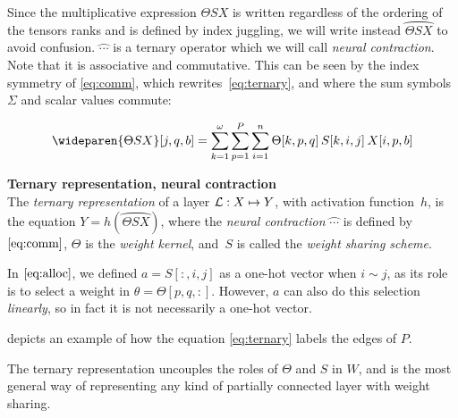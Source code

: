 Since the multiplicative expression $\Theta S X$ is written regardless of the ordering of the tensors ranks and is defined by index juggling, we will write instead $\wideparen{\Theta S X}$ to avoid confusion. $\wideparen{\cdots}$ is a ternary operator which we will call \emph{neural contraction}. Note that it is associative and commutative. This can be seen by the index symmetry of \eqref{eq:comm}, which rewrites~\eqref{eq:ternary}, and where the sum symbols~$\Sigma$ and scalar values commute:

\begin{gather}
\wideparen{\Theta SX}[j,q,b] = \displaystyle \sum_{k=1}^\omega \sum_{p=1}^P \sum_{i=1}^n \Theta[k,p,q] \h{2} S[k,i,j] \h{2} X[i,p,b] \label{eq:comm}
\end{gather}

\begin{definition}\textbf{Ternary representation, neural contraction}\\
The \emph{ternary representation} of a layer $\mathcal{L}: X \mapsto Y$, with activation function~$h$, is the equation $Y = h\left(\wideparen{\Theta S X}\right)$, where the \emph{neural contraction} $\wideparen{\cdots}$ is defined by~$\eqref{eq:comm}$, $\Theta$ is the \emph{weight kernel}, and~$S$ is called the \emph{weight sharing scheme}.
\label{def:ter}
\end{definition}

\begin{remark}
In $\eqref{eq:alloc}$, we defined $a = S[:,i,j]$ as a one-hot vector when $i \sim j$, as its role is to select a weight in $\theta = \Theta[p,q,:]$. However, $a$ can also do this selection \emph{linearly}, so in fact it is not necessarily a one-hot vector.
\end{remark}

 depicts an example of how the equation \eqref{eq:ternary} labels the edges of $P$.


The ternary representation uncouples the roles of $\Theta$ and $S$ in $W$, and is the most general way of representing any kind of partially connected layer with weight sharing.
